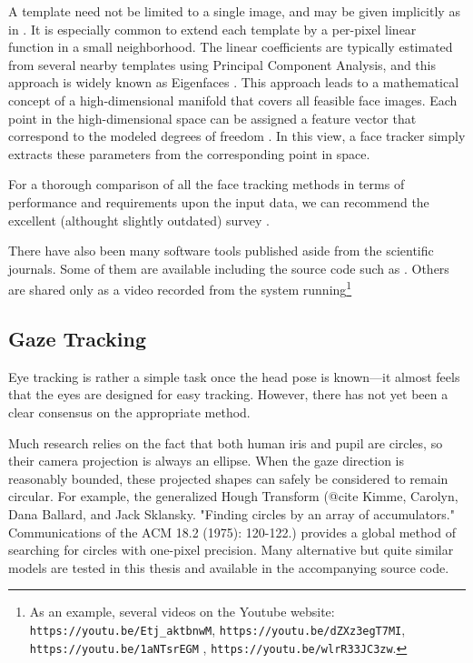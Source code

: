 A template need not be limited to a single image, and may be given implicitly as in \cite{gourier06}.
It is especially common to extend each template by a per-pixel linear function in a small neighborhood.
The linear coefficients are typically estimated from several nearby templates using Principal Component Analysis, and this approach is widely known as Eigenfaces \cite{srinivasan02,morency03}.
This approach leads to a mathematical concept of a high-dimensional manifold that covers all feasible face images.
Each point in the high-dimensional space can be assigned a feature vector that correspond to the modeled degrees of freedom \cite{balasubramanian07}.
In this view, a face tracker simply extracts these parameters from the corresponding point in space.




For a thorough comparison of all the face tracking methods in terms of performance and requirements upon the input data, we can recommend the excellent (althought slightly outdated) survey \cite{murphy-chutorian09}.

There have also been many software tools published aside from the scientific journals.
Some of them are available including the source code such as .
Others are shared only as a video recorded from the system running\footnote{
As an example, several videos on the Youtube website:
{\tt https://youtu.be/Etj\_aktbnwM},
{\tt https://youtu.be/dZXz3egT7MI},
{\tt https://youtu.be/1aNTsrEGM} ,
{\tt https://youtu.be/wlrR33JC3zw}.
}

\subsection{Gaze Tracking}

Eye tracking is rather a simple task once the head pose is known---it almost feels that the eyes are designed for easy tracking.
However, there has not yet been a clear consensus on the appropriate method.

Much research relies on the fact that both human iris and pupil are circles, so their camera projection is always an ellipse.
When the gaze direction is reasonably bounded, these projected shapes can safely be considered to remain circular.
For example, the generalized Hough Transform (@cite Kimme, Carolyn, Dana Ballard, and Jack Sklansky. "Finding circles by an array of accumulators." Communications of the ACM 18.2 (1975): 120-122.) provides a global method of searching for circles with one-pixel precision.
Many alternative but quite similar models are tested in this thesis and available in the accompanying source code.

